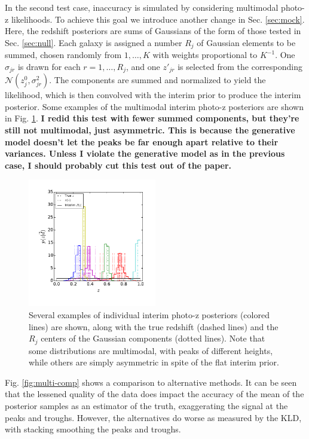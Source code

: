 \documentclass[preprint]{aastex}
\begin{document}
In the second test case, inaccuracy is simulated by considering multimodal 
photo-z likelihoods.  To achieve this goal we introduce another change in Sec. 
\ref{sec:mock}.  Here, the redshift posteriors are sums of Gaussians of the 
form of those tested in Sec. \ref{sec:null}.  Each galaxy is assigned a number 
$R_{j}$ of Gaussian elements to be summed, chosen randomly from $1,\dots,K$ 
with weights proportional to $K^{-1}$.  One $\sigma_{jr}$ is drawn for each 
$r=1,\dots,R_{j}$, and one $z'_{jr}$ is selected from the corresponding 
$\mathcal{N}(z^{0}_{j},\sigma^{2}_{jr})$.  The components are summed and 
normalized to yield the likelihood, which is then convolved with the interim 
prior to produce the interim posterior.  Some examples of the multimodal 
interim photo-z posteriors are shown in Fig. \ref{fig:multipzs}.  \textbf{I 
redid this test with fewer summed components, but they're still not multimodal, 
just asymmetric.  This is because the generative model doesn't let the peaks be 
far enough apart relative to their variances.  Unless I violate the generative 
model as in the previous case, I should probably cut this test out of the 
paper.}

\begin{figure}
\includegraphics[width=0.5\textwidth]{figs/mult/samplepzs.pdf}
\caption{Several examples of individual interim photo-z posteriors (colored 
lines) are shown, along with the true redshift (dashed lines) and the $R_{j}$ 
centers of the Gaussian components (dotted lines).  Note that some 
distributions are multimodal, with peaks of different heights, while others are 
simply asymmetric in spite of the flat interim prior.}
\label{fig:multipzs}
\end{figure}

Fig. \ref{fig:multi-comp} shows a comparison to alternative methods.  It can be 
seen that the lessened quality of the data does impact the accuracy of the mean 
of the posterior samples as an estimator of the truth, exaggerating the signal 
at the peaks and troughs.  However, the alternatives do worse as measured by 
the KLD, with stacking smoothing the peaks and troughs.
\end{document}
